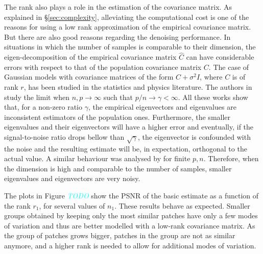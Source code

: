 \documentclass[10pt, journal, twocolumn, final, a4paper]{IEEEtran}
\newcommand{\pa}[1]{\textcolor{cyan}{#1}}
\newcommand{\prm}[1]{\pa{\sout{#1}}}
\newcommand{\pcomment}[1]{\textit{\pa{#1}}}
\begin{document}
The rank also plays a role in the estimation of the covariance matrix.
As explained in \S \ref{sec:complexity}, alleviating the computational cost is
one of the reasons for using a low rank approximation of the empirical
covariance matrix. But there are also good reasons regarding the denoising
performance. In situations in which the number of samples 
is comparable to their dimension, the eigen-decomposition of the empirical
covariance matrix $\widehat C$ can have considerable errors with respect to
that of the population covariance matrix $C$. 
%
The case of Gaussian models with covariance matrices of the form $C + \sigma^2I$,
where $C$ is of rank $r$, has been studied in the statistics and physics
literature. The authors in \cite{johnstone2009,paul2007} study the
limit when $n,p\to\infty$ such that $p/n\to\gamma < \infty$.
All these works show that, for a non-zero ratio $\gamma$, the empirical eigenvectors 
and eigenvalues are inconsistent estimators of the population ones.
Furthermore, the smaller eigenvalues and their eigenvectors will have a higher
error and eventually, if the signal-to-noise ratio drops bellow than $\sqrt{\gamma}$, 
the eigenvector is confounded with the noise and the resulting estimate will be,
in expectation, orthogonal to the actual value.
A similar behaviour was analysed by \cite{nadler2008} for finite $p,n$.
Therefore, when the dimension is high and comparable to the number of samples,
smaller eigenvalues and eigenvectors are very noisy.



The plots in Figure \pcomment{TODO} show the PSNR of the basic estimate as a function of the 
rank $r_1$, for several values of $n_{1}$.
%
%
These results behave as expected. Smaller groups obtained by keeping only the
most similar patches have only a few modes of variation and thus are better
modelled with a low-rank covariance matrix. As the group of patches grows
bigger, patches in the group are not as similar anymore, and a higher rank is
needed to allow for additional modes of variation.
\end{document}
